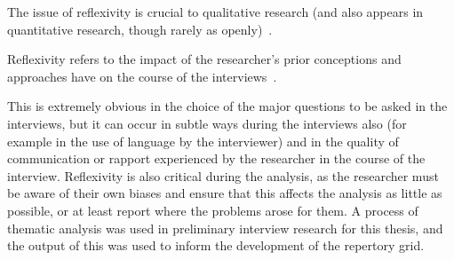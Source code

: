 The issue of reflexivity is crucial to qualitative research (and also appears in quantitative research, though rarely as openly)~\cite{rosenthal1967covert, rosenthal1969interpersonal}.

Reflexivity refers to the impact of the researcher's prior conceptions and approaches have on the course of the interviews~\cite{finlay2002outing}.

This is extremely obvious in the choice of the major questions to be asked in the interviews, but it can occur in subtle ways during the interviews also (for example in the use of language by the interviewer) and in the quality of communication or rapport experienced by the researcher in the course of the interview. Reflexivity is also critical during the analysis, as the researcher must be aware of their own biases and ensure that this affects the analysis as little as possible, or at least report where the problems arose for them. A process of thematic analysis was used in preliminary interview research for this thesis, and the output of this was used to inform the development of the repertory grid. 






